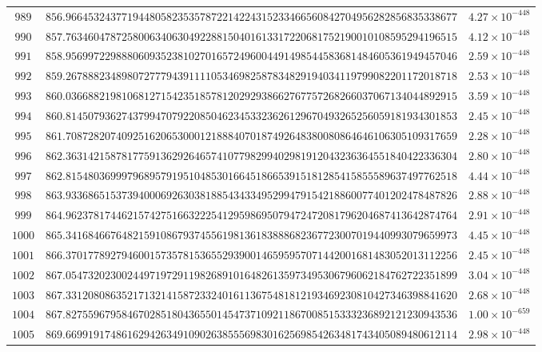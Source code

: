 \documentclass[12pt,reqno]{amsart}
\theoremstyle{remark}
\begin{document}
\begin{longtable}{clc}
$989$ & $856.9664532437719448058235357872214224315233466560842704956282856835338677$ & $4.27\times 10^{-448}$ \\
$990$ & $857.7634604787258006340630492288150401613317220681752190010108595294196515$ & $4.12\times 10^{-448}$ \\
$991$ & $858.9569972298880609352381027016572496004491498544583681484605361949457046$ & $2.59\times 10^{-448}$ \\
$992$ & $859.2678882348980727779439111105346982587834829194034119799082201172018718$ & $2.53\times 10^{-448}$ \\
$993$ & $860.0366882198106812715423518578120292938662767757268266037067134044892915$ & $3.59\times 10^{-448}$ \\
$994$ & $860.8145079362743799470792208504623453323626129670493265256059181934301853$ & $2.45\times 10^{-448}$ \\
$995$ & $861.7087282074092516206530001218884070187492648380080864646106305109317659$ & $2.28\times 10^{-448}$ \\
$996$ & $862.3631421587817759136292646574107798299402981912043236364551840422336304$ & $2.80\times 10^{-448}$ \\
$997$ & $862.8154803699979689579195104853016645186653915181285415855589637497762518$ & $4.44\times 10^{-448}$ \\
$998$ & $863.9336865153739400069263038188543433495299479154218860077401202478487826$ & $2.88\times 10^{-448}$ \\
$999$ & $864.9623781744621574275166322254129598695079472472081796204687413642874764$ & $2.91\times 10^{-448}$ \\
$1000$ & $865.3416846676482159108679374556198136183888682367723007019440993079659973$ & $4.45\times 10^{-448}$ \\
$1001$ & $866.3701778927946001573578153655293900146595957071442001681483052013112256$ & $2.45\times 10^{-448}$ \\
$1002$ & $867.0547320230024497197291198268910164826135973495306796062184762722351899$ & $3.04\times 10^{-448}$ \\
$1003$ & $867.3312080863521713214158723324016113675481812193469230810427346398841620$ & $2.68\times 10^{-448}$ \\
$1004$ & $867.8275596795846702851804365501454737109211867008515333236892121230943536$ & $1.00\times 10^{-659}$ \\
$1005$ & $869.6699191748616294263491090263855569830162569854263481743405089480612114$ & $2.98\times 10^{-448}$ \\

\end{longtable}
\end{document}
